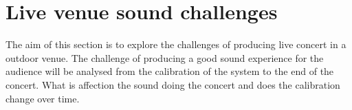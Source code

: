 \section{Live venue sound challenges}
The aim of this section is to explore the challenges of producing live concert in a outdoor venue. The challenge of producing a good sound experience for the audience will be analysed from the calibration of the system to the end of the concert. What is affection the sound doing the concert and does the calibration change over time.
